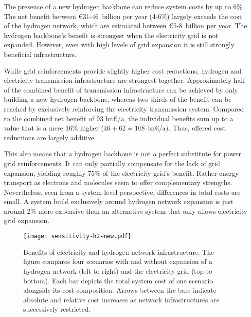 

The presence of a new hydrogen backbone can reduce system costs by up to 6\%.
The net benefit between \euro31-46~billion per year (4-6\%) largely exceeds the
cost of the hydrogen network, which are estimated between \euro5-8~billion per
year. The hydrogen backbone's benefit is strongest when the electricity grid is
not expanded. However, even with high levels of grid expansion it is still
strongly beneficial infrastructure.


While grid reinforcements provide slightly higher cost reductions, hydrogen and
electricity transmission infrastructure are strongest together. Approximately
half of the combined benefit of transmission infrastructure can be achieved by
only building a new hydrogen backbone, whereas two thirds of the benefit can be
reached by exclusively reinforcing the electricity transmission system. Compared
to the combined net benefit of 93 bn\euro/a, the individual benefits sum up to a
value that is a mere 16\% higher ($46+62=108$ bn\euro/a). Thus, offered cost
reductions are largely additive.



This also means that a hydrogen backbone is not a perfect substitute for power
grid reinforcements. It can only partially compensate for the lack of grid
expansion, yielding roughly 75\% of the electricity grid's benefit. Rather energy
transport as electrons and molecules seem to offer complementary
strengths. Nevertheless, seen from a system-level perspective, differences in
total costs are small. A system build exclusively around hydrogen network
expansion is just around 2\% more expensive than an alternative system that only
allows electricity grid expansion. %

\begin{figure}
    \centering
    \texttt{[image: sensitivity-h2-new.pdf]}
    \caption{Benefits of electricity and hydrogen network infrastructure.
    The figure compares four scenarios with and without expansion of a hydrogen network (left to right) and the electricity grid (top to bottom).
    Each bar depicts the total system cost of one scenario alongside its cost composition.
    Arrows between the bars indicate absolute and relative cost increases
    as network infrastructures are successively restricted.}
    \label{fig:sensitivity-h2}
\end{figure}



